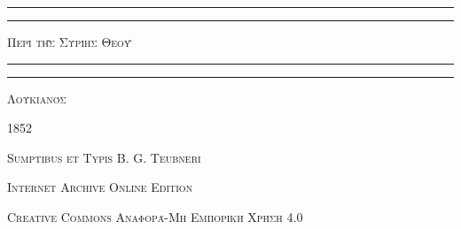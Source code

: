 \documentclass[a4paper, 11pt, oneside, polutonikogreek, german]{article}
\begin{document}
\bfseries
{}
\begin{titlepage} %
	\centering %


	\rule{\textwidth}{1.6pt}\vspace*{-\baselineskip}\vspace*{2pt} %
	\rule{\textwidth}{0.4pt} %
	
	\vspace{1\baselineskip} %
	
	{\scshape\Huge Περὶ τῆς Συρίης Θεοῦ}
	
	\vspace{1\baselineskip} %

	\rule{\textwidth}{0.4pt}\vspace*{-\baselineskip}\vspace{3.2pt} %
	\rule{\textwidth}{1.6pt} %
	
	\vspace{1\baselineskip} %
	
	
	{\scshape \Large Λουκιανός}
 
        \vspace{0.5\baselineskip}
	
	\vspace*{1\baselineskip} %
	
        {\scshape \normalsize } %

        \vspace*{\fill}    

	\vspace{1\baselineskip}

	{\small\scshape 1852}
	
	{\small\scshape{Sumptibus et Typis B. G. Teubneri}}
	
	\vspace{0.5\baselineskip} %

        \scshape Internet Archive Online Edition%
    
	{\scshape\small Creative Commons Αναφορά-Μη Εμπορική Χρήση 4.0} %
\end{titlepage}
\setlength{\parskip}{1mm plus1mm minus1mm}
\clearpage
\large
\end{document}
